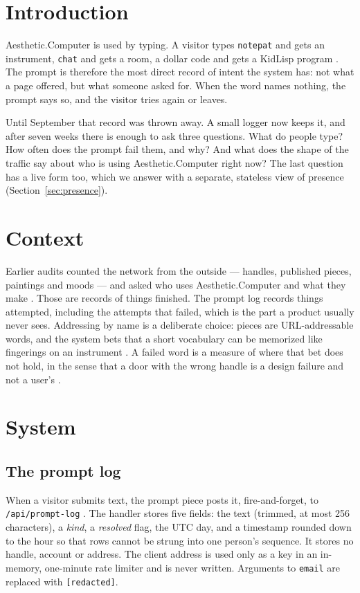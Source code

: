 \documentclass[10pt,letterpaper,twocolumn]{article}
\newcommand{\acdot}{{\color{acpink}.}}
\newcommand{\ac}{Aesthetic{\acdot}Computer}
\newcommand{\code}[1]{\texttt{#1}}
\begin{document}
\section{Introduction}
\label{sec:intro}

\ac{} is used by typing. A visitor types \code{notepat} and gets an
instrument, \code{chat} and gets a room, a dollar code and gets a KidLisp
program \citep{scudder2026ac,scudder2026kidlisp}. The prompt is therefore the
most direct record of intent the system has: not what a page offered, but what
someone asked for. When the word names nothing, the prompt says so, and the
visitor tries again or leaves.

Until September that record was thrown away. A small logger now keeps it, and
after seven weeks there is enough to ask three questions. What do people type?
How often does the prompt fail them, and why? And what does the shape of the
traffic say about who is using \ac{} right now? The last question has a live
form too, which we answer with a separate, stateless view of presence
(Section~\ref{sec:presence}).

\section{Context}
\label{sec:context}

Earlier audits counted the network from the outside --- handles, published
pieces, paintings and moods --- and asked who uses \ac{} and what they make
\citep{scudder2026network}. Those are records of things finished. The prompt
log records things attempted, including the attempts that failed, which is the
part a product usually never sees. Addressing by name is a deliberate
choice: pieces are URL-addressable words, and the system bets that a short
vocabulary can be memorized like fingerings on an instrument
\citep{scudder2026url}. A failed word is a measure of where that bet does not
hold, in the sense that a door with the wrong handle is a design failure and
not a user's \citep{norman1988design}.

\section{System}
\label{sec:system}

\subsection{The prompt log}

When a visitor submits text, the prompt piece posts it, fire-and-forget, to
\code{/api/prompt-log} \citep{acrepo2026}. The handler stores five fields: the
text (trimmed, at most 256 characters), a \emph{kind}, a \emph{resolved}
flag, the UTC day, and a timestamp rounded down to the hour so that rows
cannot be strung into one person's sequence. It stores no handle, account or
address. The client address is used only as a key in an in-memory,
one-minute rate limiter and is never written. Arguments to \code{email} are
replaced with \code{[redacted]}.
\end{document}

